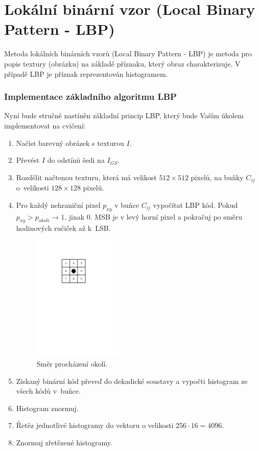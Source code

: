 \documentclass[12pt, a4paper]{article}
\begin{document}
\section{Lokální binární vzor (Local Binary Pattern - LBP)}
\par{Metoda lokálních binárních vzorů (Local Binary Pattern - LBP) je metoda pro popis textury (obrázku) na základě příznaku, který obraz charakterizuje. V případě LBP je příznak reprezentován histogramem.}

\subsubsection*{Implementace základního algoritmu LBP}
\par{Nyní bude stručně nastíněn základní princip LBP, který bude Vaším úkolem implementovat na cvičení:}
\begin{enumerate}
	\item Načíst barevný obrázek s texturou $I$.
	\item Převést $I$ do odstínů šedi na $I_{GS}$.
	\item Rozdělit načtenou texturu, která má velikost $512 \times 512$ pixelů, na buňky $C_{ij}$ o~velikosti $128 \times 128$ pixelů.
	\item Pro každý nehraniční pixel $p_{xy}$ v buňce $C_{ij}$ vypočítat LBP kód. Pokud $p_{xy} > p_{okoli} \rightarrow 1$, jinak $0$. MSB je v levý horní pixel a pokračuj po směru hodinových ručiček až k~LSB.
		\begin{figure}[!ht]
			\centering
			\includegraphics[width = 0.4\textwidth, trim = 4cm 19cm 5cm 4.5cm]{./okoli.pdf}
			\caption{Směr procházení okolí.}
		\end{figure}
	\item Získaný binární kód převeď do dekadické soustavy a vypočti histogram ze všech kódů v~buňce.
	\item Histogram znormuj.
	\item Řetěz jednotlivé histogramy do vektoru o velikosti $256 \cdot 16 = 4096$.
	\item Znormuj zřetězené histogramy.
\end{enumerate}
\end{document}
